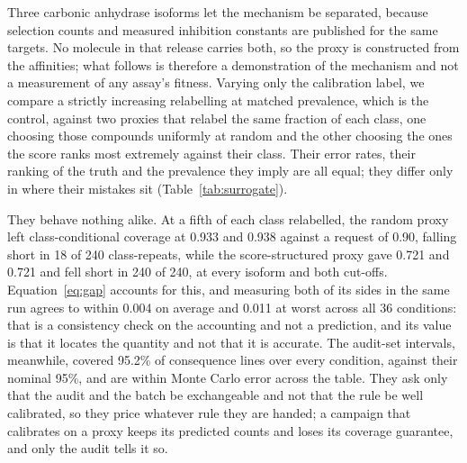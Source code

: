 \documentclass[twocolumn,10pt]{article}
\begin{document}
Three carbonic anhydrase isoforms let the mechanism be separated, because selection counts and
measured inhibition constants are published for the same
targets.\citep{He2026CADEL,Zdrazil2024ChEMBL} No molecule in that release carries both, so the
proxy is constructed from the affinities; what follows is therefore a demonstration of the mechanism and not a measurement of any assay's fitness. Varying only the calibration label, we
compare a strictly increasing relabelling at matched prevalence, which is the control, against
two proxies that relabel the same fraction of each class, one choosing those compounds uniformly at random and the other choosing the ones the score ranks most extremely against their
class. Their error rates, their ranking of the truth and the prevalence they imply are all equal;
they differ only in where their mistakes sit (Table~\ref{tab:surrogate}).

They behave nothing alike. At a fifth of each class relabelled, the random proxy left class-conditional coverage at 0.933 and 0.938 against a request of 0.90, falling short in 18 of 240 class-repeats, while the score-structured proxy gave 0.721 and 0.721 and fell short in 240 of 240, at every isoform and both cut-offs. Equation~\ref{eq:gap} accounts for this, and measuring both of its sides in the same run agrees to within 0.004 on average and 0.011 at worst across all 36 conditions: that is a consistency check on the accounting and not a prediction, and its value is that it locates the quantity and not that it is accurate. The audit-set intervals, meanwhile, covered 95.2\% of consequence lines over every condition, against their nominal 95\%, and are within Monte Carlo error across the table. They ask only that the audit and the batch be exchangeable and not that the rule be well calibrated, so they price whatever rule they are handed; a campaign that calibrates on a proxy keeps its predicted counts and loses its coverage guarantee, and only the audit tells it so.
\end{document}
